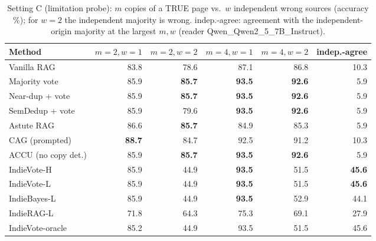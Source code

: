 \begin{table}[tbp]
\centering
\small
\caption{Setting C (limitation probe): $m$ copies of a TRUE page vs.\ $w$ independent wrong sources (accuracy \%); for $w{=}2$ the independent majority is wrong. indep.-agree: agreement with the independent-origin majority at the largest $m,w$ (reader Qwen\_Qwen2\_5\_7B\_Instruct).}
\label{tab:symC}
\setlength{\tabcolsep}{4pt}
\begin{tabular}{lrrrrr}
\toprule
Method & $m{=}2,w{=}1$ & $m{=}2,w{=}2$ & $m{=}4,w{=}1$ & $m{=}4,w{=}2$ & indep.-agree \\
\midrule
Vanilla RAG & 83.8 & 78.6 & 87.1 & 86.8 & 10.3 \\
Majority vote & 85.9 & \textbf{85.7} & \textbf{93.5} & \textbf{92.6} & 5.9 \\
Near-dup + vote & 85.9 & \textbf{85.7} & \textbf{93.5} & \textbf{92.6} & 5.9 \\
SemDedup + vote & 85.9 & 79.6 & \textbf{93.5} & \textbf{92.6} & 5.9 \\
Astute RAG & 86.6 & \textbf{85.7} & 84.9 & 85.3 & 5.9 \\
CAG (prompted) & \textbf{88.7} & 84.7 & 92.5 & 91.2 & 10.3 \\
ACCU (no copy det.) & 85.9 & \textbf{85.7} & \textbf{93.5} & \textbf{92.6} & 5.9 \\
IndieVote-H & 85.9 & 44.9 & \textbf{93.5} & 51.5 & \textbf{45.6} \\
IndieVote-L & 85.9 & 44.9 & \textbf{93.5} & 51.5 & \textbf{45.6} \\
IndieBayes-L & 85.9 & 44.9 & \textbf{93.5} & 52.9 & 44.1 \\
IndieRAG-L & 71.8 & 64.3 & 75.3 & 69.1 & 27.9 \\
IndieVote-oracle & 85.2 & 44.9 & 93.5 & 51.5 & 45.6 \\
\bottomrule
\end{tabular}
\end{table}
